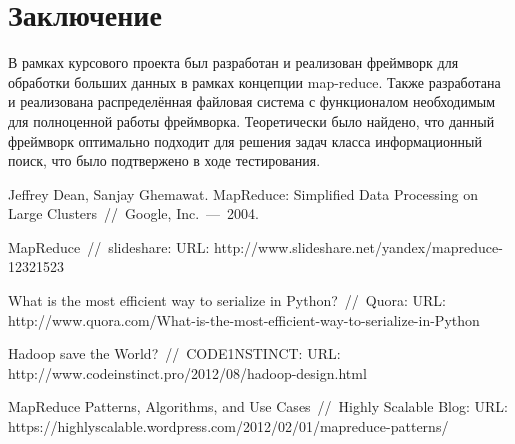 \documentclass[12pt,a4paper,oneside]{extarticle}
\begin{document}
\section{Заключение}
    В рамках курсового проекта был разработан и реализован фреймворк для обработки больших данных в рамках концепции map-reduce. Также разработана и реализована распределённая файловая система с функционалом необходимым для полноценной работы фреймворка. Теоретически было найдено, что данный фреймворк оптимально подходит для решения задач класса информационный поиск, что было подтвержено в ходе тестирования.    
\clearpage


\begin{thebibliography}{0}
        Jeffrey Dean, Sanjay Ghemawat. MapReduce: Simplified Data Processing on Large Clusters~//~Google, Inc.~---~2004.

        MapReduce~//~slideshare: URL: \newline
        http://www.slideshare.net/yandex/mapreduce-12321523

        What is the most efficient way to serialize in Python?~//~Quora: URL:  \newline
        http://www.quora.com/What-is-the-most-efficient-way-to-serialize-in-Python

        Hadoop save the World?~//~CODE1NSTINCT: URL:  \newline
        http://www.codeinstinct.pro/2012/08/hadoop-design.html

        MapReduce Patterns, Algorithms, and Use Cases~//~Highly Scalable Blog: URL:  \newline
        https://highlyscalable.wordpress.com/2012/02/01/mapreduce-patterns/
        
\end{thebibliography}
\end{document}
